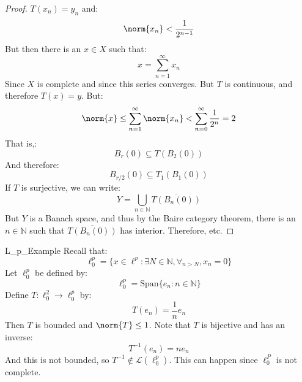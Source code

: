 \begin{proof}
        $T(x_{n})=y_{n}$ and:
        \begin{equation}
            \norm{x_{n}}<\frac{1}{2^{n-1}}
        \end{equation}
        But then there is an $x\in{X}$ such that:
        \begin{equation}
            x=\sum_{n=1}^{\infty}x_{n}
        \end{equation}
        Since $X$ is complete and since this series converges.
        But $T$ is continuous, and therefore $T(x)=y$. But:
        \begin{equation}
            \norm{x}\leq\sum_{n=1}^{\infty}\norm{x_{n}}
            <\sum_{n=0}^{\infty}\frac{1}{2^{n}}=2
        \end{equation}
        That is,:
        \begin{equation}
            B_{r}(0)\subseteq{T}(B_{2}(0))
        \end{equation}
        And therefore:
        \begin{equation}
            B_{r/2}(0)\subseteq
            T_{1}(B_{1}(0))
        \end{equation}
        If $T$ is surjective, we can write:
        \begin{equation}
            Y=\bigcup_{n\in\mathbb{N}}
            \overline{T(B_{n}(0))}
        \end{equation}
        But $Y$ is a Banach space, and thus by the Baire
        category theorem, there is an $n\in\mathbb{N}$ such
        that $\overline{T(B_{n}(0))}$ has interior. Therefore,
        etc.
    \end{proof}
    \begin{lexample}{}{L_p_Example}
        Recall that:
        \begin{equation}
            \ell_{0}^{p}=
            \{x\in\ell^{p}:\exists{N\in\mathbb{N}},
                \forall_{n>N},x_{n}=0\}
        \end{equation}
        Let $\ell_{0}^{p}$ be defined by:
        \begin{equation}
            \ell_{0}^{p}=\mathrm{Span}\{e_{n}:n\in\mathbb{N}\}
        \end{equation}
        Define $T:\ell_{0}^{2}\rightarrow\ell_{0}^{p}$ by:
        \begin{equation}
            T(e_{n})=\frac{1}{n}e_{n}
        \end{equation}
        Then $T$ is bounded and $\norm{T}\leq{1}$. Note that
        $T$ is bijective and has an inverse:
        \begin{equation}
            T^{\minus{1}}(e_{n})=ne_{n}
        \end{equation}
        And this is not bounded, so
        $T^{\minus{1}}\notin\mathcal{L}(\ell_{0}^{p})$.
        This can happen since $\ell_{0}^{P}$ is not complete.
    \end{lexample}
